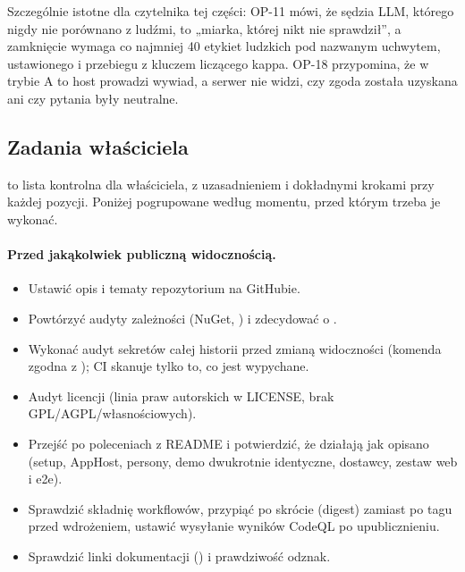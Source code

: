 Szczególnie istotne dla czytelnika tej części: OP-11 mówi, że sędzia LLM, którego nigdy nie porównano z ludźmi, to „miarka, której nikt nie sprawdził”, a zamknięcie wymaga co najmniej 40 etykiet ludzkich pod nazwanym uchwytem, ustawionego  i przebiegu z kluczem liczącego kappa. OP-18 przypomina, że w trybie A to host prowadzi wywiad, a serwer nie widzi, czy zgoda została uzyskana ani czy pytania były neutralne.

\subsection{Zadania właściciela}

 to lista kontrolna dla właściciela, z uzasadnieniem i dokładnymi krokami przy każdej pozycji. Poniżej pogrupowane według momentu, przed którym trzeba je wykonać.

\paragraph{Przed jakąkolwiek publiczną widocznością.}
\begin{itemize}[leftmargin=*,itemsep=2pt]
  \item Ustawić opis i tematy repozytorium na GitHubie.
  \item Powtórzyć audyty zależności (NuGet, ) i zdecydować o .
  \item Wykonać audyt sekretów całej historii przed zmianą widoczności (komenda zgodna z ); CI skanuje tylko to, co jest wypychane.
  \item Audyt licencji (linia praw autorskich w LICENSE, brak GPL/AGPL/własnościowych).
  \item Przejść po poleceniach z README i potwierdzić, że działają jak opisano (setup, AppHost, persony, demo dwukrotnie identyczne, dostawcy, zestaw web i e2e).
  \item Sprawdzić składnię workflowów, przypiąć  po skrócie (digest) zamiast po tagu przed wdrożeniem, ustawić wysyłanie wyników CodeQL po upublicznieniu.
  \item Sprawdzić linki dokumentacji () i prawdziwość odznak.
\end{itemize}

